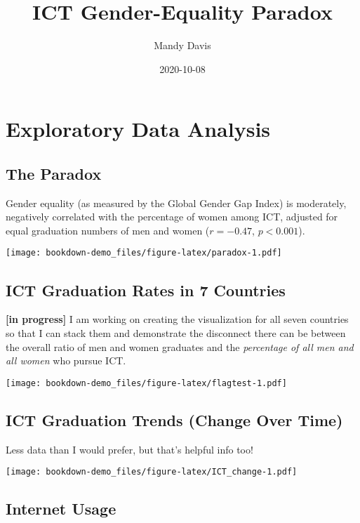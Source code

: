 \documentclass[]{book}
\title{ICT Gender-Equality Paradox}
\author{Mandy Davis}
\date{2020-10-08}
\begin{document}
\maketitle

{
\setcounter{tocdepth}{1}
\tableofcontents
}
\chapter{Exploratory Data Analysis}\label{exploratory-data-analysis}

\section{The Paradox}\label{the-paradox}

Gender equality (as measured by the Global Gender Gap Index) is
moderately, negatively correlated with the percentage of women among
ICT, adjusted for equal graduation numbers of men and women
(\(r = -0.47\), \(p < 0.001\)).

\texttt{[image: bookdown-demo\_files/figure-latex/paradox-1.pdf]}

\section{ICT Graduation Rates in 7
Countries}\label{ict-graduation-rates-in-7-countries}

\textbf{{[}in progress{]}} I am working on creating the visualization
for all seven countries so that I can stack them and demonstrate the
disconnect there can be between the overall ratio of men and women
graduates and the \emph{percentage of all men and all women} who pursue
ICT.

\texttt{[image: bookdown-demo\_files/figure-latex/flagtest-1.pdf]}

\section{ICT Graduation Trends (Change Over
Time)}\label{ict-graduation-trends-change-over-time}

Less data than I would prefer, but that's helpful info too!

\texttt{[image: bookdown-demo\_files/figure-latex/ICT\_change-1.pdf]}

\section{Internet Usage}\label{internet-usage}
\end{document}
